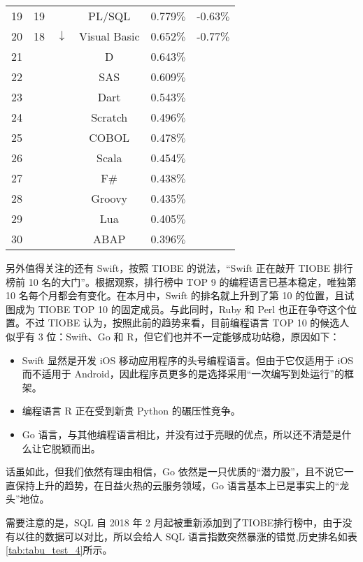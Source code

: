 \begin{longtabu}{cccccc}
	19	&	19	&		&	PL/SQL	&	0.779$\%$	&	-0.63$\%$	\\
	20	&	18	&	$\downarrow$	&	Visual Basic	&	0.652$\%$	&	-0.77$\%$	\\
	21	&		&		&	D	&	0.643$\%$	&		\\
	22	&		&		&	SAS	&	0.609$\%$	&		\\
	23	&		&		&	Dart	&	0.543$\%$	&		\\
	24	&		&		&	Scratch	&	0.496$\%$	&		\\
	25	&		&		&	COBOL	&	0.478$\%$	&		\\
	26	&		&		&	Scala	&	0.454$\%$	&		\\
	27	&		&		&	F$\#$	&	0.438$\%$	&		\\
	28	&		&		&	Groovy	&	0.435$\%$	&		\\
	29	&		&		&	Lua	&	0.405$\%$	&		\\
	30	&		&		&	ABAP	&	0.396$\%$	&		\\
\end{longtabu}

另外值得关注的还有 Swift，按照 TIOBE 的说法，“Swift 正在敲开 TIOBE 排行榜前 10 名的大门”。根据观察，排行榜中 TOP 9 的编程语言已基本稳定，唯独第 10 名每个月都会有变化。在本月中，Swift 的排名就上升到了第 10 的位置，且试图成为 TIOBE TOP 10 的固定成员。与此同时，Ruby 和 Perl 也正在争夺这个位置。不过 TIOBE 认为，按照此前的趋势来看，目前编程语言 TOP 10 的候选人似乎有 3 位：Swift、Go 和 R，但它们也并不一定能够成功站稳，原因如下：

\begin{itemize}
	\item Swift 显然是开发 iOS 移动应用程序的头号编程语言。但由于它仅适用于 iOS 而不适用于 Android，因此程序员更多的是选择采用“一次编写到处运行”的框架。
	\item 编程语言 R 正在受到新贵 Python 的碾压性竞争。
	\item Go 语言，与其他编程语言相比，并没有过于亮眼的优点，所以还不清楚是什么让它脱颖而出。
\end{itemize}

话虽如此，但我们依然有理由相信，Go 依然是一只优质的“潜力股”，且不说它一直保持上升的趋势，在日益火热的云服务领域，Go 语言基本上已是事实上的“龙头”地位。

需要注意的是，SQL 自 2018 年 2 月起被重新添加到了TIOBE排行榜中，由于没有以往的数据可以对比，所以会给人 SQL 语言指数突然暴涨的错觉,历史排名如表\ref{tab:tabu_test_4}所示。

